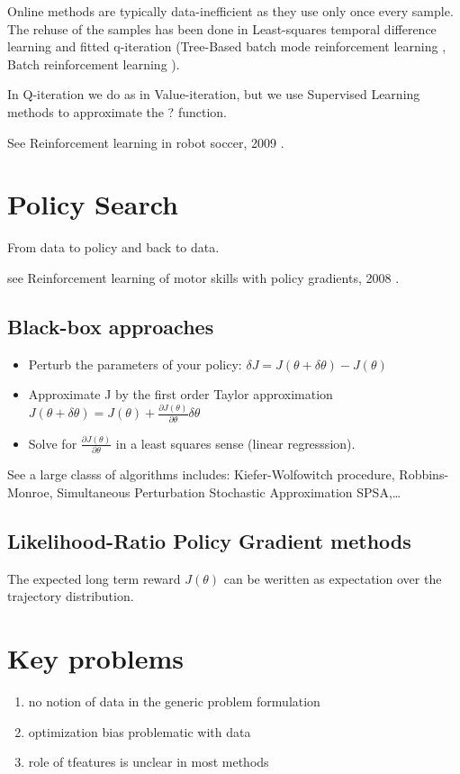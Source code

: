 \documentclass[b5paper]{report}
\begin{document}
Online methods are typically data-inefficient as they use only once every
sample. The rehuse of the samples has been done in Least-squares temporal
difference learning and fitted q-iteration (Tree-Based batch mode reinforcement
learning \cite{ernst2005tree}, Batch reinforcement learning
\cite{lange2012batch}).

In Q-iteration we do as in Value-iteration, but we use Supervised Learning
methods to approximate the ? function.

See Reinforcement learning in robot soccer, 2009
\cite{riedmiller2009reinforcement}.


\section{Policy Search}

From data to policy and back to data.

see Reinforcement learning of motor skills with policy gradients, 2008
\cite{peters2008reinforcement}.

\subsection{Black-box approaches}


\begin{itemize}
  \item Perturb the parameters of your policy: $\delta J = J(\theta + \delta
    \theta) - J(\theta)$
  \item Approximate J by the first order Taylor approximation $J(\theta +
    \delta\theta) = J(\theta) + \frac{\partial
    J(\theta)}{\partial\theta}\delta\theta$
  \item Solve for $\frac{\partial J(\theta)}{\partial \theta}$ in a least
    squares sense (linear regresssion).
\end{itemize}

See a large classs of algorithms includes: Kiefer-Wolfowitch procedure,
Robbins-Monroe, Simultaneous Perturbation Stochastic Approximation SPSA,\dots

\subsection{Likelihood-Ratio Policy Gradient methods}

The expected long term reward $J(\theta)$ can be weritten as expectation over
the trajectory distribution.

\section{Key problems}

\begin{enumerate}
  \item no notion of data in the generic problem formulation
  \item optimization bias problematic with data
  \item role of tfeatures is unclear in most methods
\end{enumerate}
\end{document}
